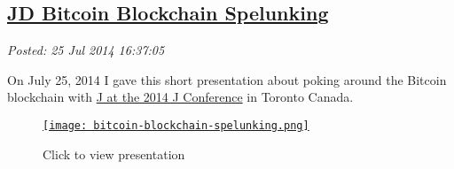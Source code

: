 %

\subsection*{\href{https://bakerjd99.wordpress.com/2014/07/25/jd-bitcoin-blockchain-spelunking/}{JD Bitcoin Blockchain Spelunking}}


\noindent\emph{Posted: 25 Jul 2014 16:37:05}
\vspace{6pt}

On July 25, 2014 I gave this short presentation about poking around the
Bitcoin blockchain with \href{https://www.jsoftware.com/jwiki/Community/Conference2014}{J at the
2014 J Conference} in Toronto Canada.



\captionsetup[figure]{labelformat=empty}


\begin{figure}[htbp]
\centering
\href{https://github.com/bakerjd99/jacks/blob/master/bitcoin/JD-Bitcoin-Blockchain-Spelunking.pdf}{\texttt{[image: bitcoin-blockchain-spelunking.png]}}
\caption{Click to view presentation}
\label{fig:4793X0}
\end{figure}


%